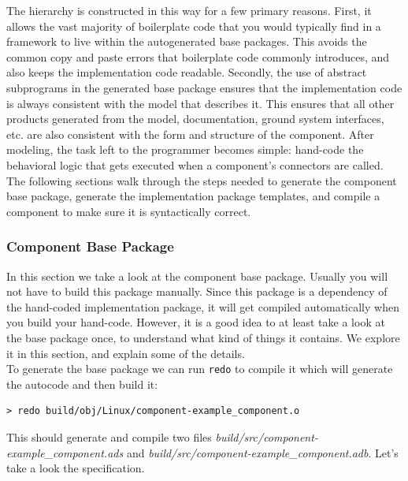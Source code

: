 The hierarchy is constructed in this way for a few primary reasons. First, it allows the vast majority of boilerplate code that you would typically find in a framework to live within the autogenerated base packages. This avoids the common copy and paste errors that boilerplate code commonly introduces, and also keeps the implementation code readable. Secondly, the use of abstract subprograms in the generated base package ensures that the implementation code is always consistent with the model that describes it. This ensures that all other products generated from the model, documentation, ground system interfaces, etc. are also consistent with the form and structure of the component. After modeling, the task left to the programmer becomes simple: hand-code the behavioral logic that gets executed when a component's connectors are called. \\

The following sections walk through the steps needed to generate the component base package, generate the implementation package templates, and compile a component to make sure it is syntactically correct.

\subsubsection{Component Base Package} \label{Component Base Package}

In this section we take a look at the component base package. Usually you will not have to build this package manually. Since this package is a dependency of the hand-coded implementation package, it will get compiled automatically when you build your hand-code. However, it is a good idea to at least take a look at the base package once, to understand what kind of things it contains. We explore it in this section, and explain some of the details. \\

To generate the base package we can run \texttt{redo} to compile it which will generate the autocode and then build it:

\vspace{5mm} %
\begin{verbatim}
> redo build/obj/Linux/component-example_component.o
\end{verbatim}
\vspace{5mm} %

This should generate and compile two files \textit{build/src/component-example\_component.ads} and \textit{build/src/component-example\_component.adb}. Let's take a look the specification. \\

